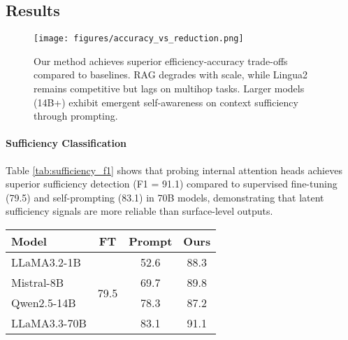 \subsection{Results}  
\label{sec:results}


\begin{figure*}[htpb!]
    \centering
    \texttt{[image: figures/accuracy\_vs\_reduction.png]}
    \caption{Our method achieves superior efficiency-accuracy trade-offs compared to baselines. RAG degrades with scale, while Lingua2 remains competitive but lags on multihop tasks. Larger models (14B+) exhibit emergent self-awareness on context sufficiency through prompting.}
    \label{fig:accuracy_vs_reduction}
\end{figure*}



\noindent\begin{minipage}[t]{0.48\textwidth}
\paragraph{Sufficiency Classification}
Table \ref{tab:sufficiency_f1} shows that probing internal attention heads achieves superior sufficiency detection (F1 = 91.1) compared to supervised fine-tuning (79.5) and self-prompting (83.1) in 70B models, demonstrating that latent sufficiency signals are more reliable than surface-level outputs. 
\end{minipage}
\hfill
\begin{minipage}[t]{0.48\textwidth}
    \centering
    \vspace{-3em}
    \begin{tabular}{l c c c}
        \toprule
        \textbf{Model} & \textbf{FT} & \textbf{Prompt} & \textbf{Ours} \\
        \midrule
        LLaMA3.2-1B  & \multirow{4}{*}{79.5} & 52.6 & 88.3 \\
        Mistral-8B   &                        & 69.7 & 89.8 \\
        Qwen2.5-14B  &                        & 78.3 & 87.2 \\
        LLaMA3.3-70B &                        & 83.1 & 91.1 \\
        \bottomrule
    \end{tabular}
    \label{tab:sufficiency_f1}
\end{minipage}

